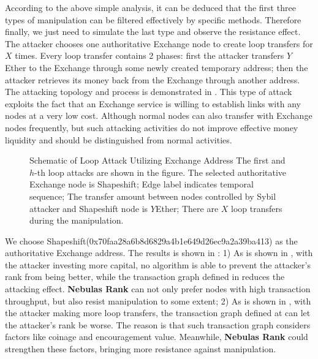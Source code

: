 According to the above simple analysis, it can be deduced that the first three types of manipulation can be filtered effectively by specific methods. Therefore finally, we just need to simulate the last type and observe the resistance effect. The attacker chooses one authoritative Exchange node to create loop transfers for $X$ times. Every loop transfer contains 2 phases: first the attacker transfers $Y$ Ether to the Exchange through some newly created temporary address; then the attacker retrieves its money back from the Exchange through another address. The attacking topology and process is demonstrated in . This type of attack exploits the fact that an Exchange service is willing to establish links with any nodes at a very low cost. Although normal nodes can also transfer with Exchange nodes frequently, but such attacking activities do not improve effective money liquidity and should be distinguished from normal activities.
\begin{figure}[!ht]
	\centering
  
	\caption{Schematic of Loop Attack Utilizing Exchange Address \small{The first and $h$-th loop attacks are shown in the figure. The selected authoritative Exchange node is Shapeshift; Edge label indicates temporal sequence; The transfer amount between nodes controlled by Sybil attacker and Shapeshift node is $Y$Ether; There are $X$ loop transfers during the manipulation.}}\label{fig:loop}
\end{figure}

We choose Shapeshift(0x70faa28a6b8d6829a4b1e649d26ec9a2a39ba413) as the authoritative Exchange address. The results is shown in : 1) As is shown in , with the attacker investing more capital, no algorithm is able to prevent the attacker's rank from being better, while the transaction graph defined in  reduces the attacking effect. \textbf{Nebulas Rank} can not only prefer nodes with high transaction throughput, but also resist manipulation to some extent; 2) As is shown in , with the attacker making more loop transfers, the transaction graph defined at  can let the attacker's rank be worse. The reason is that such transaction graph considers factors like coinage and encouragement value. Meanwhile, \textbf{Nebulas Rank} could strengthen these factors, bringing more resistance against manipulation.

